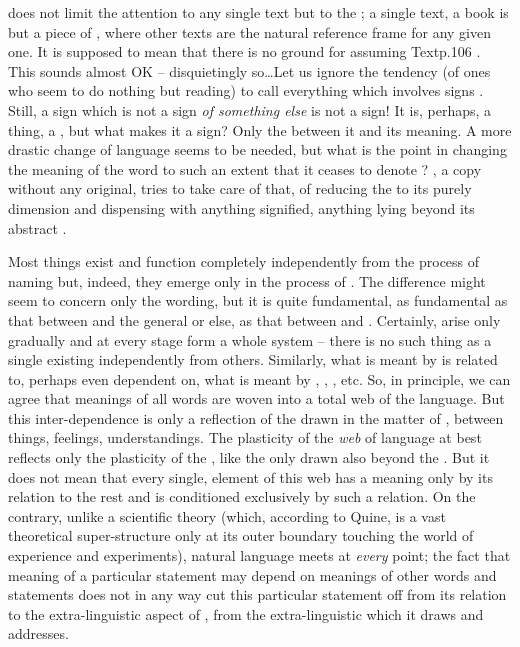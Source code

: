 \pa {} does not limit the attention to any
single text but to the ; a single text, a 
{book} is but a piece of , where other texts are
the natural reference frame for any given one.  It is supposed to mean
that there is no ground for assuming \citet{anything beyond the signs,
anything whose sameness and existence would not be conditioned by the
process of naming}{Text}{p.106 }. This sounds almost
OK -- disquietingly so\ldots Let us ignore the tendency (of ones who
seem to do nothing but reading) to call everything which involves
signs .  Still, a sign which is not a sign {\em of something
else} is not a sign!  It is, perhaps, a thing, a , but what
makes it a sign?  Only the  between it and its meaning.
A more drastic change of language seems to be
needed, but what is the point in changing the meaning of the word
 to such an extent that it ceases to denote ? 
, a copy without any original, tries to take care
of that, of reducing the  to its purely  dimension
and dispensing with anything signified, anything lying beyond its abstract
. 

Most things exist and function completely independently from the process of
naming but, indeed, they emerge only in the process of . The
difference might seem to concern only the wording, but it is quite fundamental,
as fundamental as that between  and the general
 or else, as that between  and . 
Certainly,  arise only gradually and at every stage form a
whole system -- there is no such thing
as a single  existing  independently from others.
Similarly, what is meant by  is related to, perhaps even dependent on,
what is meant by , , , etc.  So, in
principle, we can agree that meanings of all words are woven into a total web of
the language.  But this inter-dependence is only a reflection of the
 drawn in the matter of , between things,
feelings, understandings.  The plasticity of the {\em web} of language at best
reflects only the plasticity of the , like the 
 only  drawn also beyond the \hoa.  But it does not
mean that every single,  element of this web has a meaning only by
its relation to the rest and is conditioned exclusively by such a relation.  On
the contrary, unlike a scientific theory (which, according to Quine, is a vast
theoretical super-structure only at its outer boundary touching the world of
experience and experiments), natural language meets  at {\em
  every} point; the fact that meaning of a particular statement may depend on
meanings of other words and statements does not in any way cut this particular
statement off from its relation to the extra-linguistic aspect of
, from the extra-linguistic  which it draws and
addresses.

